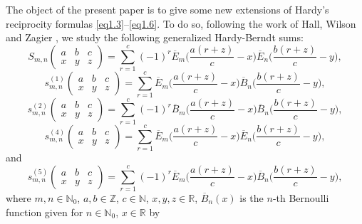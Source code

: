 \documentclass[reqno]{amsart}
\numberwithin{equation}{section}
\begin{document}
The object of the present paper is to give some new extensions of Hardy's reciprocity formulas \eqref{eq1.3}--\eqref{eq1.6}. To do so, following the work of Hall, Wilson and Zagier \cite{hall}, we study the following generalized Hardy-Berndt sums:
\begin{equation}\label{eq1.7}
S_{m,n}\left(
\begin{matrix}
a & b & c \\
x & y & z
\end{matrix}
\right)=\sum_{r=1}^{c}(-1)^{r}\overline{E}_{m}\biggl(\frac{a(r+z)}{c}-x\biggl)\overline{E}_{n}\biggl(\frac{b(r+z)}{c}-y\biggl),
\end{equation}
\begin{equation}\label{eq1.8}
s_{m,n}^{(1)}\left(
\begin{matrix}
a & b & c \\
x & y & z
\end{matrix}
\right)=\sum_{r=1}^{c}\overline{E}_{m}\biggl(\frac{a(r+z)}{c}-x\biggl)\overline{B}_{n}\biggl(\frac{b(r+z)}{c}-y\biggl),
\end{equation}
\begin{equation}\label{eq1.9}
s_{m,n}^{(2)}\left(
\begin{matrix}
a & b & c \\
x & y & z
\end{matrix}
\right)=\sum_{r=1}^{c}(-1)^{r}\overline{B}_{m}\biggl(\frac{a(r+z)}{c}-x\biggl)\overline{B}_{n}\biggl(\frac{b(r+z)}{c}-y\biggl),
\end{equation}
\begin{equation}\label{eq1.10}
s_{m,n}^{(4)}\left(
\begin{matrix}
a & b & c \\
x & y & z
\end{matrix}
\right)=\sum_{r=1}^{c}\overline{E}_{m}\biggl(\frac{a(r+z)}{c}-x\biggl)\overline{E}_{n}\biggl(\frac{b(r+z)}{c}-y\biggl),
\end{equation}
and
\begin{equation}\label{eq1.11}
s_{m,n}^{(5)}\left(
\begin{matrix}
a & b & c \\
x & y & z
\end{matrix}
\right)=\sum_{r=1}^{c}(-1)^{r}\overline{E}_{m}\biggl(\frac{a(r+z)}{c}-x\biggl)\overline{B}_{n}\biggl(\frac{b(r+z)}{c}-y\biggl),
\end{equation}
where $m,n\in\mathbb{N}_{0}$, $a,b\in\mathbb{Z}$, $c\in\mathbb{N}$, $x,y,z\in\mathbb{R}$, $\overline{B}_{n}(x)$ is the $n$-th Bernoulli function given for $n\in\mathbb{N}_{0}$, $x\in\mathbb{R}$ by
\end{document}
